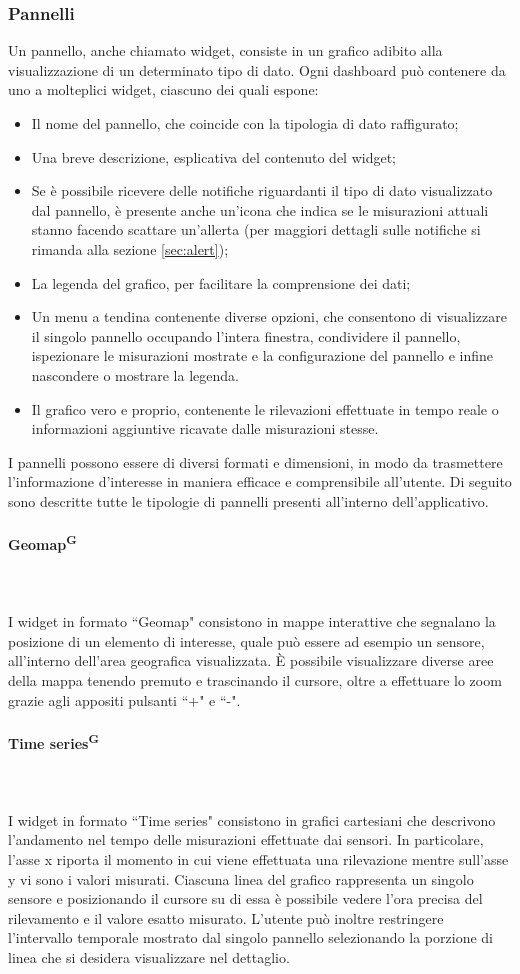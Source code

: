 \documentclass[8pt]{article}
\newcommand{\glossterm}[1]{#1\textsuperscript{G}} %
\newcommand{\subsubsubsection}[1]{\paragraph{#1}\mbox{}\\\\}
\begin{document}
\subsubsection{Pannelli}
Un pannello, anche chiamato widget, consiste in un grafico adibito alla visualizzazione di un determinato tipo di dato. Ogni dashboard può contenere da uno a molteplici widget, ciascuno dei quali espone:
\begin{itemize}
\setlength\itemsep{0em}
    \item Il nome del pannello, che coincide con la tipologia di dato raffigurato;
    \item Una breve descrizione, esplicativa del contenuto del widget;
    \item Se è possibile ricevere delle notifiche riguardanti il tipo di dato visualizzato dal pannello, è presente anche un'icona che indica se le misurazioni attuali stanno facendo scattare un'allerta (per maggiori dettagli sulle notifiche si rimanda alla sezione \ref{sec:alert});
    \item La legenda del grafico, per facilitare la comprensione dei dati;
    \item Un menu a tendina contenente diverse opzioni, che consentono di visualizzare il singolo pannello occupando l'intera finestra, condividere il pannello, ispezionare le misurazioni mostrate e la configurazione del pannello e infine nascondere o mostrare la legenda.
    \item Il grafico vero e proprio, contenente le rilevazioni effettuate in tempo reale o informazioni aggiuntive ricavate dalle misurazioni stesse.
\end{itemize}
I pannelli possono essere di diversi formati e dimensioni, in modo da trasmettere l'informazione d'interesse in maniera efficace e comprensibile all'utente. Di seguito sono descritte tutte le tipologie di pannelli presenti all'interno dell'applicativo.

\subsubsubsection{\glossterm{Geomap}}
I widget in formato ``Geomap" consistono in mappe interattive che segnalano la posizione di un elemento di interesse, quale può essere ad esempio un sensore, all'interno dell'area geografica visualizzata. È possibile visualizzare diverse aree della mappa tenendo premuto e trascinando il cursore, oltre a effettuare lo zoom grazie agli appositi pulsanti ``+" e ``-". 
\subsubsubsection{\glossterm{Time series}}
I widget in formato ``Time series" consistono in grafici cartesiani che descrivono l'andamento nel tempo delle misurazioni effettuate dai sensori. In particolare, l'asse x riporta il momento in cui viene effettuata una rilevazione mentre sull'asse y vi sono i valori misurati. Ciascuna linea del grafico rappresenta un singolo sensore e posizionando il cursore su di essa è possibile vedere l'ora precisa del rilevamento e il valore esatto misurato. L'utente può inoltre restringere l'intervallo temporale mostrato dal singolo pannello selezionando la porzione di linea che si desidera visualizzare nel dettaglio.
\end{document}
